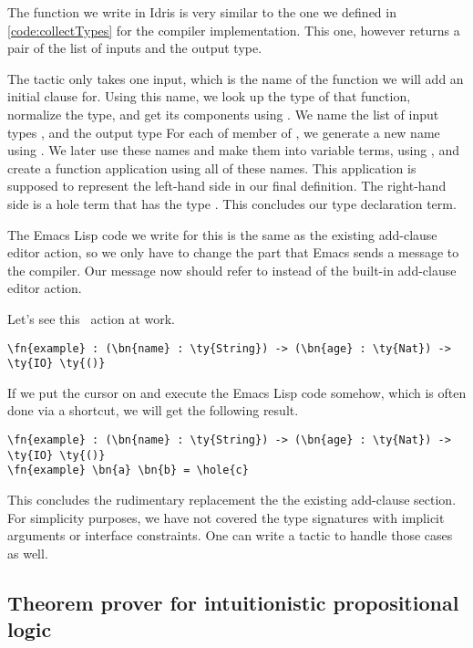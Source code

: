 The  function we write in Idris is very similar to the one we
defined in \autoref{code:collectTypes} for the compiler implementation. 
This one, however returns a pair of the list of inputs and the output type.

The  tactic only takes one input, which is the name of the function
we will add an initial clause for.
Using this name, we look up the type of that function,
normalize the type, and get its components
using .
We name the list of input types , and the output type 
For each of member of , we generate a new name using
. We later use these names and make them
into variable terms, using , and create a function application using
all of these names. This application is supposed to represent the left-hand
side in our final definition. The right-hand side is a hole term that has the
type .  This concludes our type declaration term.

The Emacs Lisp code we write for this is the same as the existing add-clause
editor action, so we only have to change the part that Emacs sends a message to
the compiler. Our message now should refer to  instead of the
built-in add-clause editor action.

Let's see this \Elab\ action at work.

\begin{Verbatim}
\fn{example} : (\bn{name} : \ty{String}) -> (\bn{age} : \ty{Nat}) -> \ty{IO} \ty{()}
\end{Verbatim}

If we put the cursor on  and execute the Emacs Lisp code somehow,
which is often done via a shortcut, we will get the following result.

\begin{Verbatim}
\fn{example} : (\bn{name} : \ty{String}) -> (\bn{age} : \ty{Nat}) -> \ty{IO} \ty{()}
\fn{example} \bn{a} \bn{b} = \hole{c}
\end{Verbatim}

This concludes the rudimentary replacement the the existing add-clause section.
For simplicity purposes, we have not covered the type signatures with implicit
arguments or interface constraints. One can write a tactic to handle
those cases as well.

\subsection{Theorem prover for intuitionistic propositional logic}\label{sec:hezarfen}

